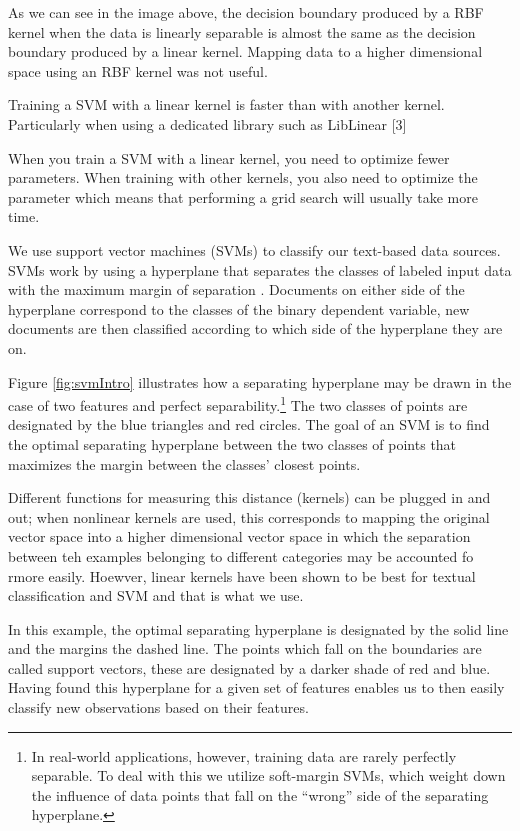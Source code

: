 \documentclass[pdftex,12pt,fullpage,oneside]{amsart}
\begin{document}
As we can see in the image above, the decision boundary produced by a RBF kernel when the data is linearly separable is almost the same as the decision boundary produced by a linear kernel. Mapping data to a higher dimensional space using an RBF kernel was not useful.

\citep{hsu2003practical}

Training a SVM with a linear kernel is faster than with another kernel. Particularly when using a dedicated library such as LibLinear [3]

When you train a SVM with a linear kernel, you need to optimize fewer parameters.  When training with other kernels, you also need to optimize the parameter which means that performing a grid search will usually take more time.

We use support vector machines (SVMs) to classify our text-based data sources. SVMs work by using a hyperplane that separates the classes of labeled input data with the maximum margin of separation \citep{vapnik2000nature,chang2011libsvm}. Documents on either side of the hyperplane correspond to the classes of the binary dependent variable, new documents are then classified according to which side of the hyperplane they are on.

Figure \ref{fig:svmIntro} illustrates how a separating hyperplane may be drawn in the case of two features and perfect separability.\footnote{In real-world applications, however, training data are rarely perfectly separable. To deal with this we utilize soft-margin SVMs, which weight down the influence of data points that fall on the ``wrong'' side of the separating hyperplane.} The two classes of points are designated by the blue triangles and red circles. The goal of an SVM is to find the optimal separating hyperplane between the two classes of points that maximizes the margin between the classes' closest points. 

Different functions for measuring this distance (kernels) can be plugged in and out; when nonlinear kernels are used, this corresponds to mapping the original vector space into a higher dimensional vector space in which the separation between teh examples belonging to different categories may be accounted fo rmore easily. Hoewver, linear kernels have been shown to be best for textual classification and SVM and that is what we use. 

In this example, the optimal separating hyperplane is designated by the solid line and the margins the dashed line. The points which fall on the boundaries are called support vectors, these are designated by a darker shade of red and blue. Having found this hyperplane for a given set of features enables us to then easily classify new observations based on their features. 
\end{document}
